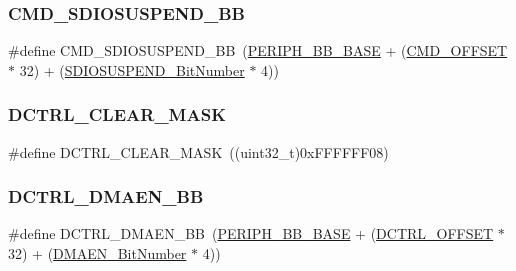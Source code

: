 \mbox{\label{group___s_d_i_o___private___types_definitions_ga931e48aa282e2a937308f57f807e0781}} 
\subsubsection{\texorpdfstring{CMD\_SDIOSUSPEND\_BB}{CMD\_SDIOSUSPEND\_BB}}
{\footnotesize\ttfamily \#define C\+M\+D\+\_\+\+S\+D\+I\+O\+S\+U\+S\+P\+E\+N\+D\+\_\+\+BB~(\mbox{\hyperlink{group___peripheral__memory__map_gaed7efc100877000845c236ccdc9e144a}{P\+E\+R\+I\+P\+H\+\_\+\+B\+B\+\_\+\+B\+A\+SE}} + (\mbox{\hyperlink{group___s_d_i_o___private___types_definitions_gaf12d26702ce7a88d2a3dae87f000b75e}{C\+M\+D\+\_\+\+O\+F\+F\+S\+ET}} $\ast$ 32) + (\mbox{\hyperlink{group___s_d_i_o___private___types_definitions_gaf88f03a42d76974b55dfb8bda65ade97}{S\+D\+I\+O\+S\+U\+S\+P\+E\+N\+D\+\_\+\+Bit\+Number}} $\ast$ 4))}

\mbox{\label{group___s_d_i_o___private___types_definitions_ga9e9fc7810b95805aeeb760bbdd87fa9b}} 
\subsubsection{\texorpdfstring{DCTRL\_CLEAR\_MASK}{DCTRL\_CLEAR\_MASK}}
{\footnotesize\ttfamily \#define D\+C\+T\+R\+L\+\_\+\+C\+L\+E\+A\+R\+\_\+\+M\+A\+SK~((uint32\+\_\+t)0x\+F\+F\+F\+F\+F\+F08)}

\mbox{\label{group___s_d_i_o___private___types_definitions_ga43f7336d4f955c6cf1f676ccbc043fe9}} 
\subsubsection{\texorpdfstring{DCTRL\_DMAEN\_BB}{DCTRL\_DMAEN\_BB}}
{\footnotesize\ttfamily \#define D\+C\+T\+R\+L\+\_\+\+D\+M\+A\+E\+N\+\_\+\+BB~(\mbox{\hyperlink{group___peripheral__memory__map_gaed7efc100877000845c236ccdc9e144a}{P\+E\+R\+I\+P\+H\+\_\+\+B\+B\+\_\+\+B\+A\+SE}} + (\mbox{\hyperlink{group___s_d_i_o___private___types_definitions_ga948c1382c4cfd3af3e406c4d0cdd4240}{D\+C\+T\+R\+L\+\_\+\+O\+F\+F\+S\+ET}} $\ast$ 32) + (\mbox{\hyperlink{group___s_d_i_o___private___types_definitions_gab2af311e327213503f0dbf3d013b7944}{D\+M\+A\+E\+N\+\_\+\+Bit\+Number}} $\ast$ 4))}

